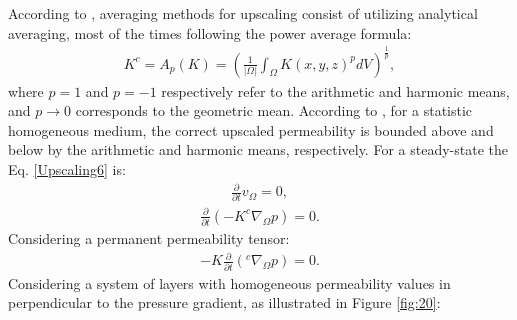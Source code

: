 According to \cite{Lie2015}, averaging methods for upscaling consist of utilizing analytical averaging, most of the times following the power average formula:
\begin{align}
\label{Upscaling7}
K^c=A_p(K)=\left(\frac{1}{|\Omega|}\int_{\Omega}K(x,y,z)^pdV\right)^{\frac{1}{p}},
\end{align}
where $p=1$ and $p=-1$ respectively refer to the arithmetic and harmonic means, and $p \rightarrow 0$ corresponds to the geometric mean. According to \cite{Wiener1912}, for a statistic homogeneous medium, the correct upscaled permeability is bounded above and below by the arithmetic and harmonic means, respectively. For a steady-state the Eq. \ref{Upscaling6} is:
\begin{align}
\label{Upscaling8}
\frac{\partial}{\partial t}v_\Omega= 0,
\end{align}
\begin{align}
\label{Upscaling9}
\frac{\partial}{\partial t} \left(-K^c\nabla_\Omega p\right)= 0.
\end{align}
Considering a permanent permeability tensor:
\begin{align}
\label{Upscaling10}
-K\frac{\partial}{\partial t} \left(^c\nabla_\Omega p\right)= 0.
\end{align}
Considering a system of layers with homogeneous permeability values in perpendicular to the pressure gradient, as illustrated in Figure \ref{fig:20}:

